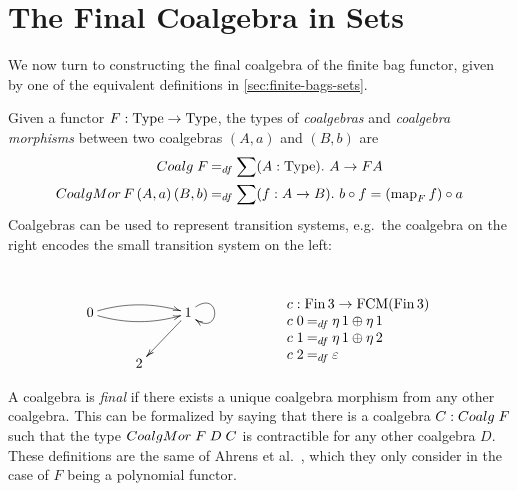 \documentclass[final,a4paper,USenglish,cleveref]{lipics-v2021}
\begin{document}
\section{The Final Coalgebra in Sets}\label{sec:final-coalgebra-sets}

We now turn to constructing the final coalgebra of the finite bag functor, given by one of the equivalent definitions in \cref{sec:finite-bags-sets}. %

Given a functor $F : \Type \to \Type$, the types of \emph{coalgebras}
and \emph{coalgebra morphisms} between two coalgebras $(A,a)$ and
$(B,b)$ are 
\begin{align*}
  \Coalg\;F &\DefEq \sum (A : \Type) \Where A \to F A \\
  \CoalgMor\,F\,(A,a)\,(B,b) &\DefEq \sum (f : A \to B) \Where b \circ f = (\Map{F} f) \circ a
\end{align*}
Coalgebras can be used to represent transition systems, e.g.~the coalgebra on the right encodes the small transition system on the left:
\vspace{-.8cm}
\[
\begin{array}{c@{\qquad\qquad\qquad}c}
\xymatrix{
  0 \ar@/^/[rr] \ar@/_/[rr] & & 1 \ar[dl] \ar@(ur,dr) \\
  & 2 &
}
&
\begin{array}{l}
  \\ \\
  c : \Fin 3 \to \FCM (\Fin 3) \\
  c \; 0 \DefEq \Singl 1 \Union \Singl 1 \\
  c \; 1 \DefEq \Singl 1 \Union \Singl 2 \\
  c \; 2 \DefEq \Empty
\end{array}
\end{array}
\]

A coalgebra is \emph{final} if there exists a unique coalgebra morphism from any other coalgebra. This can be formalized by saying that there is a coalgebra $C : \Coalg\;F$ such that the type $\CoalgMor\;F\;D\;C$ is contractible for any other coalgebra $D$. These definitions are the same of Ahrens et al.~\cite{Ahrens2015}, which they only consider in the case of $F$ being a polynomial functor.
\end{document}
